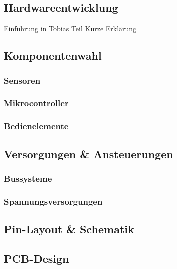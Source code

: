 \begin{inhalt}
\renewcommand*\chapterpagestyle{scrheadings}
\chapter{Hardwareentwicklung}

Einführung in Tobias Teil Kurze Erklärung
\section{Komponentenwahl}
\subsection{Sensoren}
\subsection{Mikrocontroller}
\subsection{Bedienelemente}





\section{Versorgungen \& Ansteuerungen}
\subsection{Bussysteme}
\subsection{Spannungsversorgungen}

\section{Pin-Layout \& Schematik}


\section{PCB-Design}


\end{inhalt}